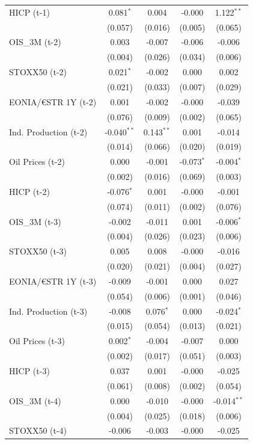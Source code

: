 \begin{longtable}[t]{lcccc}
HICP (t-1) & 0.081$^{*}$ & 0.004 & -0.000 & 1.122$^{**}$\\
 & (0.057) & (0.016) & (0.005) & (0.065)\\
OIS\_3M (t-2) & 0.003 & -0.007 & -0.006 & -0.006\\
 & (0.004) & (0.026) & (0.034) & (0.006)\\
STOXX50 (t-2) & 0.021$^{*}$ & -0.002 & 0.000 & 0.002\\
 & (0.021) & (0.033) & (0.007) & (0.029)\\
EONIA/€STR 1Y (t-2) & 0.001 & -0.002 & -0.000 & -0.039\\
 & (0.076) & (0.009) & (0.002) & (0.065)\\
Ind. Production (t-2) & -0.040$^{**}$ & 0.143$^{**}$ & 0.001 & -0.014\\
 & (0.014) & (0.066) & (0.020) & (0.019)\\
Oil Prices (t-2) & 0.000 & -0.001 & -0.073$^{*}$ & -0.004$^{*}$\\
 & (0.002) & (0.016) & (0.069) & (0.003)\\
HICP (t-2) & -0.076$^{*}$ & 0.001 & -0.000 & -0.001\\
 & (0.074) & (0.011) & (0.002) & (0.076)\\
OIS\_3M (t-3) & -0.002 & -0.011 & 0.001 & -0.006$^{*}$\\
 & (0.004) & (0.026) & (0.023) & (0.006)\\
STOXX50 (t-3) & 0.005 & 0.008 & -0.000 & -0.016\\
 & (0.020) & (0.021) & (0.004) & (0.027)\\
EONIA/€STR 1Y (t-3) & -0.009 & -0.001 & 0.000 & 0.027\\
 & (0.054) & (0.006) & (0.001) & (0.046)\\
Ind. Production (t-3) & -0.008 & 0.076$^{*}$ & 0.000 & -0.024$^{*}$\\
 & (0.015) & (0.054) & (0.013) & (0.021)\\
Oil Prices (t-3) & 0.002$^{*}$ & -0.004 & -0.007 & 0.000\\
 & (0.002) & (0.017) & (0.051) & (0.003)\\
HICP (t-3) & 0.037 & 0.001 & -0.000 & -0.025\\
 & (0.061) & (0.008) & (0.002) & (0.054)\\
OIS\_3M (t-4) & 0.000 & -0.010 & -0.000 & -0.014$^{**}$\\
 & (0.004) & (0.025) & (0.018) & (0.006)\\
STOXX50 (t-4) & -0.006 & -0.003 & -0.000 & -0.025\\

\end{longtable}
